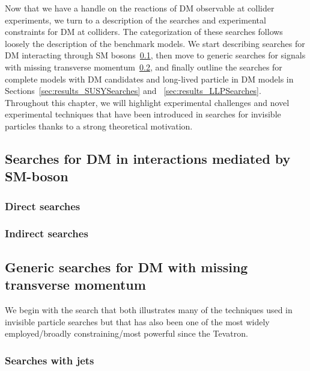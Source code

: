 Now that we have a handle on the reactions of DM observable at collider experiments, we turn to a description of the searches and experimental constraints for DM at colliders. The categorization of these searches follows loosely the description of the benchmark models. We start describing searches for DM interacting through SM bosons~\ref{sec:results_ZHSearches}, then move to generic searches for signals with missing transverse momentum~\ref{sec:results_monoXSearches}, and finally outline the searches for complete models with DM candidates and long-lived particle in DM models in Sections~\ref{sec:results_SUSYSearches} and ~\ref{sec:results_LLPSearches}. Throughout this chapter, we will highlight experimental challenges and novel experimental techniques that have been introduced in searches for invisible particles thanks to a strong theoretical motivation. %

\subsection{Searches for DM in interactions mediated by SM-boson}
\label{sec:results_ZHSearches}

\subsubsection{Direct searches}

\subsubsection{Indirect searches}

\subsection{Generic searches for DM with missing transverse momentum}
\label{sec:results_monoXSearches}

We begin with the search that both illustrates many of the techniques used in invisible particle searches but that has also been one of the most widely employed/broadly constraining/most powerful since the Tevatron. 

\subsubsection{Searches with jets}

